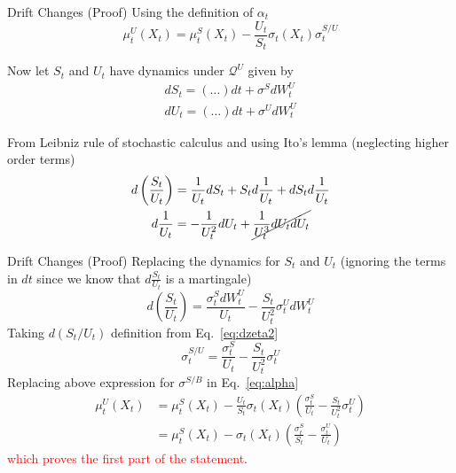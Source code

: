 \documentclass{beamer}
\begin{document}
\begin{frame}{Drift Changes (Proof)}
	Using the definition of $\alpha_t$
	\begin{equation}
	\mu_t^U(X_t)=\mu_t^S(X_t)-\frac{U_t}{S_t}\sigma_t(X_t)\sigma^{S/U}_t
	\label{eq:alpha}
	\end{equation}
	
	Now let $S_t$ and $U_t$ have dynamics under $\mathcal{Q}^U$ given by 
	\begin{equation*}
		\begin{gathered}
			dS_t = (\ldots) dt + \sigma^S dW^U_t\\
			dU_t = (\ldots) dt + \sigma^U dW^U_t 
		\end{gathered}
	\end{equation*}
	
	From Leibniz rule of stochastic calculus and using Ito's lemma (neglecting higher order terms)
	\begin{equation*}
		\begin{gathered}
		d\left(\frac{S_t}{U_t}\right)=\frac{1}{U_t}dS_t+S_td\frac{1}{U_t}+dS_td\frac{1}{U_t} \\
		d\frac{1}{U_t}=-\frac{1}{U^2_t}dU_t+\cancel{\frac{1}{U^3_t}dU_tdU_t}
		\end{gathered}
	\end{equation*}
\end{frame}

\begin{frame}{Drift Changes (Proof)}
	Replacing the dynamics for $S_t$ and $U_t$ (ignoring the terms in $dt$ since we know that $d\frac{S_t}{U_t}$ is a martingale)
	\begin{equation}
		d\left(\frac{S_t}{U_t}\right) = \frac{\sigma^S_t dW^U_t}{U_t} - \frac{S_t}{U^2_t}\sigma^U_t dW^U_t
	\end{equation}
	Taking $d(S_t/U_t)$ definition from Eq.~\ref{eq:dzeta2}
	\begin{equation}
	\sigma_t^{S/U} = \frac{\sigma^S_t}{U_t} - \frac{S_t}{U^2_t}\sigma^U_t
	\end{equation}
	Replacing above expression for $\sigma^{S/B}$ in Eq.~\ref{eq:alpha}
	\begin{equation}
		\begin{aligned}
			\mu_t^U(X_t)&=\mu_t^S(X_t)-\frac{U_t}{S_t}\sigma_t(X_t)\left(\frac{\sigma^S_t}{U_t} - \frac{S_t}{U^2_t}\sigma^U_t\right)\\
			&=\mu_t^S(X_t)-\sigma_t(X_t)\left(\frac{\sigma^S_t}{S_t} - \frac{\sigma^U_t}{U_t}\right)
		\end{aligned}
	\end{equation}
	\textcolor{red}{which proves the first part of the statement}.
\end{frame}
\end{document}
